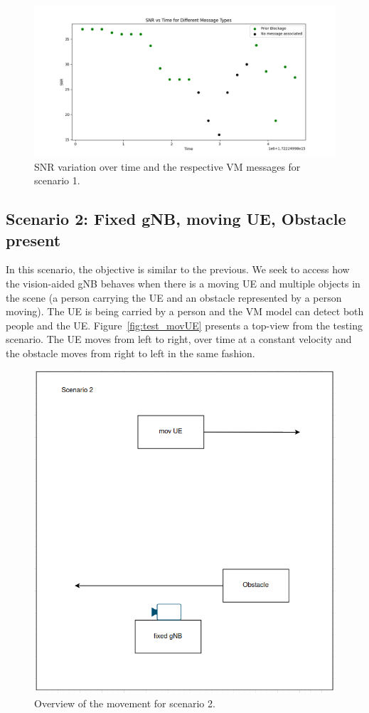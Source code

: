 \begin{figure}[H]
    \centering
    \includegraphics[width=\linewidth]{figures/results_1}
    \caption{SNR variation over time and the respective VM messages for scenario 1.}
    \label{fig:results_1}
\end{figure}

\subsection{Scenario 2: Fixed gNB, moving UE, Obstacle present}\label{subsec:scenario-0.1:-fixed-gnb-moving-ue-obstacle-present}

In this scenario, the objective is similar to the previous.
We seek to access how the vision-aided gNB behaves when there is a moving UE and multiple objects in the scene (a person carrying the UE and an obstacle represented by a person moving)\@.
The UE is being carried by a person and the VM model can detect both people and the UE\@.
Figure~\ref{fig:test_movUE} presents a top-view from the testing scenario.
The UE moves from left to right, over time at a constant velocity and the obstacle moves from right to left in the same fashion.

\begin{figure}[H]
    \centering
    \includegraphics[width=0.5\linewidth]{figures/scenario2}
    \caption{Overview of the movement for scenario 2.}
    \label{fig:test_movUE_obst}
\end{figure}


